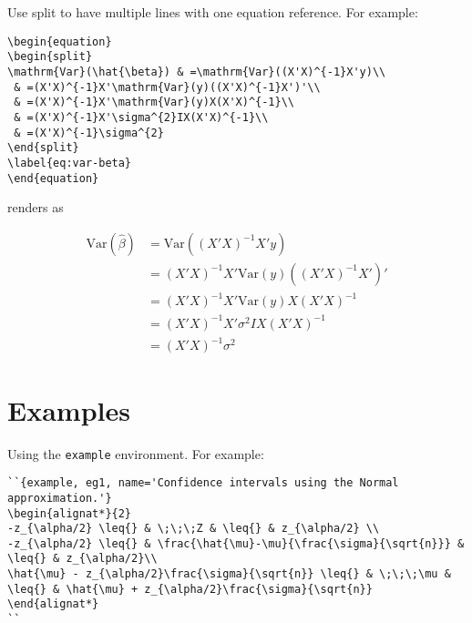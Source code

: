 \documentclass[
  oneside]{krantz}
\theoremstyle{definition}
\theoremstyle{definition}
\theoremstyle{definition}
\theoremstyle{remark}
\begin{document}
Use split to have multiple lines with one equation reference. For example:

\begin{verbatim}
\begin{equation} 
\begin{split}
\mathrm{Var}(\hat{\beta}) & =\mathrm{Var}((X'X)^{-1}X'y)\\
 & =(X'X)^{-1}X'\mathrm{Var}(y)((X'X)^{-1}X')'\\
 & =(X'X)^{-1}X'\mathrm{Var}(y)X(X'X)^{-1}\\
 & =(X'X)^{-1}X'\sigma^{2}IX(X'X)^{-1}\\
 & =(X'X)^{-1}\sigma^{2}
\end{split}
\label{eq:var-beta}
\end{equation} 
\end{verbatim}

renders as

\begin{equation} 
\begin{split}
\mathrm{Var}(\hat{\beta}) & =\mathrm{Var}((X'X)^{-1}X'y)\\
 & =(X'X)^{-1}X'\mathrm{Var}(y)((X'X)^{-1}X')'\\
 & =(X'X)^{-1}X'\mathrm{Var}(y)X(X'X)^{-1}\\
 & =(X'X)^{-1}X'\sigma^{2}IX(X'X)^{-1}\\
 & =(X'X)^{-1}\sigma^{2}
\end{split}
\label{eq:var-beta}
\end{equation}

\hypertarget{examples}{%
\section{Examples}\label{examples}}

Using the \texttt{example} environment. For example: 

\begin{verbatim}
``{example, eg1, name='Confidence intervals using the Normal approximation.'}
\begin{alignat*}{2}
-z_{\alpha/2} \leq{} & \;\;\;Z & \leq{} & z_{\alpha/2} \\
-z_{\alpha/2} \leq{} & \frac{\hat{\mu}-\mu}{\frac{\sigma}{\sqrt{n}}} & \leq{} & z_{\alpha/2}\\
\hat{\mu} - z_{\alpha/2}\frac{\sigma}{\sqrt{n}} \leq{} & \;\;\;\mu & \leq{} & \hat{\mu} + z_{\alpha/2}\frac{\sigma}{\sqrt{n}}
\end{alignat*}
``
\end{verbatim}
\end{document}
